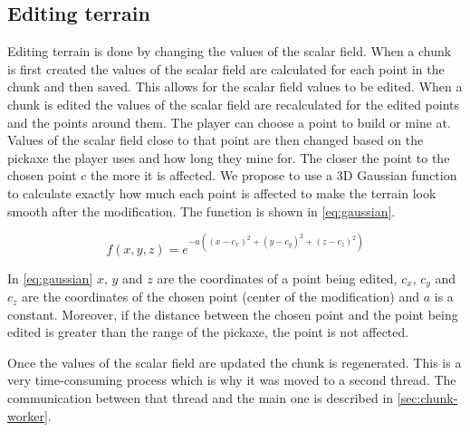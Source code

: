 \subsection{Editing terrain} \label{sec:terrain_editing}
Editing terrain is done by changing the values of the scalar field.
When a chunk is first created the values of the scalar field are calculated for each point in the chunk and then saved.
This allows for the scalar field values to be edited.
When a chunk is edited the values of the scalar field are recalculated for the edited points and the points around them.
The player can choose a point to build or mine at.
Values of the scalar field close to that point are then changed based on the pickaxe the player uses and how long they mine for.
The closer the point to the chosen point $c$ the more it is affected.
We propose to use a 3D Gaussian function to calculate exactly how much each point is affected to make the terrain look smooth after the modification.
The function is shown in \autoref{eq:gaussian}.

\begin{equation}
    \label{eq:gaussian}
    f(x, y, z) = e^{-a \left((x - c_x)^2 + (y - c_y)^2 + (z - c_z)^2\right)}
\end{equation}

In \autoref{eq:gaussian} $x$, $y$ and $z$ are the coordinates of a point being edited, $c_x$, $c_y$ and $c_z$ are the coordinates of the chosen point (center of the modification) and $a$ is a constant.
Moreover, if the distance between the chosen point and the point being edited is greater than the range of the pickaxe, the point is not affected.

Once the values of the scalar field are updated the chunk is regenerated.
This is a very time-consuming process which is why it was moved to a second thread.
The communication between that thread and the main one is described in \autoref{sec:chunk-worker}.